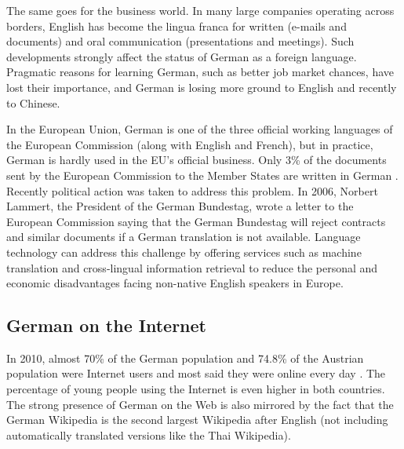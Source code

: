 \documentclass[]{../../metanetpaper}
\begin{document}
\begin{multicols}{2}

The same goes for the business world. In many large companies operating across borders, English has become the lingua franca for written (e-mails and documents) and oral communication (presentations and meetings). Such developments strongly affect the status of German as a foreign language. Pragmatic reasons for learning German, such as better job market chances, have lost their importance, and German is losing more ground to English and recently to Chinese. 


In the European Union, German is one of the three official working languages of the European Commission (along with English and French), but in practice, German is hardly used in the EU’s official business. Only 3\% of the documents sent by the European Commission to the Member States are written in German \cite{joy1}. Recently political action was taken to address this problem. In 2006, Norbert Lammert, the President of the German Bundestag, wrote a letter to the European Commission saying that the German Bundestag will reject contracts and similar documents if a German translation is not available. Language technology can address this challenge by offering services such as machine translation and cross-lingual information retrieval to reduce the personal and economic disadvantages facing non-native English speakers in Europe.

\subsection{German on the Internet}

In 2010, almost 70\% of the German population and 74.8\% of the Austrian population were Internet users and most said they were online every day \cite{ard1,ict1}. The percentage of young people using the Internet is even higher in both countries. The strong presence of German on the Web is also mirrored by the fact that the German Wikipedia is the second largest Wikipedia after English (not including automatically translated versions like the Thai Wikipedia).



\end{multicols}
\end{document}
